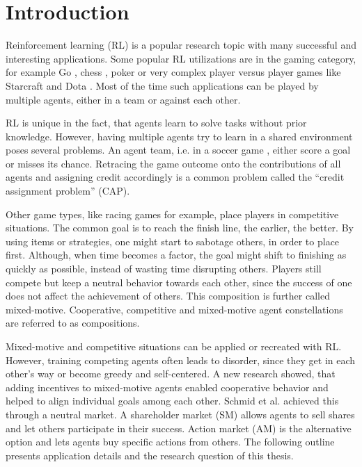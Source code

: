 \chapter{Introduction}\label{sec:Introduction}

Reinforcement learning (RL) is a popular research topic with many successful and interesting applications. Some popular RL utilizations are in the gaming category, for example Go \cite{sihu16}\cite{sisc17}, chess \cite{batr01}\cite{sihu17}, poker \cite{da01}\cite{xuch21} or very complex player versus player games like Starcraft \cite{viba19} and Dota \cite{bebr19}. Most of the time such applications can be played by multiple agents, either in a team or against each other. 

RL is unique in the fact, that agents learn to solve tasks without prior knowledge. However, having multiple agents try to learn in a shared environment poses several problems. An agent team, i.e. in a soccer game \cite{agtu04}, either score a goal or misses its chance. Retracing the game outcome onto the contributions of all agents and assigning credit accordingly is a common problem called the ``credit assignment problem'' (CAP). 

Other game types, like racing games for example, place players in competitive situations. The common goal is to reach the finish line, the earlier, the better. By using items or strategies, one might start to sabotage others, in order to place first. Although, when time becomes a factor, the goal might shift to finishing as quickly as possible, instead of wasting time disrupting others. Players still compete but keep a neutral behavior towards each other, since the success of one does not affect the achievement of others. This composition is further called mixed-motive. Cooperative, competitive and mixed-motive agent constellations are referred to as compositions.

Mixed-motive and competitive situations can be applied or recreated with RL. However, training competing agents often leads to disorder, since they get in each other's way or become greedy and self-centered. A new research showed, that adding incentives to mixed-motive agents enabled cooperative behavior and helped to align individual goals among each other. Schmid et al. \cite{scbe21} achieved this through a neutral market. A shareholder market (SM) allows agents to sell shares and let others participate in their success. Action market (AM) is the alternative option and lets agents buy specific actions from others. The following outline presents application details and the research question of this thesis. 

